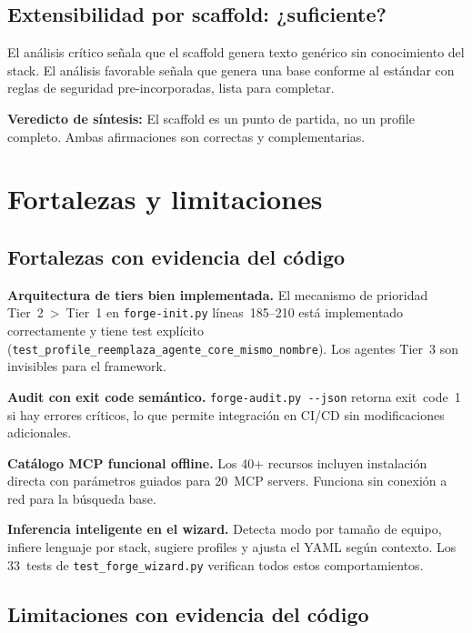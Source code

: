 \documentclass[12pt,a4paper]{article}
\begin{document}
\subsection{Extensibilidad por scaffold: ¿suficiente?}

El an\'alisis cr\'itico se\~nala que el scaffold genera texto gen\'erico sin conocimiento del stack. El an\'alisis favorable se\~nala que genera una base conforme al est\'andar con reglas de seguridad pre-incorporadas, lista para completar.

\textbf{Veredicto de s\'intesis:} El scaffold es un punto de partida, no un profile completo. Ambas afirmaciones son correctas y complementarias.

\section{Fortalezas y limitaciones}

\subsection{Fortalezas con evidencia del código}

\textbf{Arquitectura de tiers bien implementada.} El mecanismo de prioridad Tier~2~>~Tier~1 en \texttt{forge-init.py} l\'ineas~185--210 est\'a implementado correctamente y tiene test expl\'icito (\texttt{test\_profile\_reemplaza\_agente\_core\_mismo\_nombre}). Los agentes Tier~3 son invisibles para el framework.

\textbf{Audit con exit code sem\'antico.} \texttt{forge-audit.py -{}-json} retorna exit~code~1 si hay errores cr\'iticos, lo que permite integraci\'on en CI/CD sin modificaciones adicionales.

\textbf{Cat\'alogo MCP funcional offline.} Los 40+ recursos incluyen instalaci\'on directa con par\'ametros guiados para 20~MCP servers. Funciona sin conexi\'on a red para la b\'usqueda base.

\textbf{Inferencia inteligente en el wizard.} Detecta modo por tama\~no de equipo, infiere lenguaje por stack, sugiere profiles y ajusta el YAML seg\'un contexto. Los 33~tests de \texttt{test\_forge\_wizard.py} verifican todos estos comportamientos.

\subsection{Limitaciones con evidencia del código}
\end{document}
